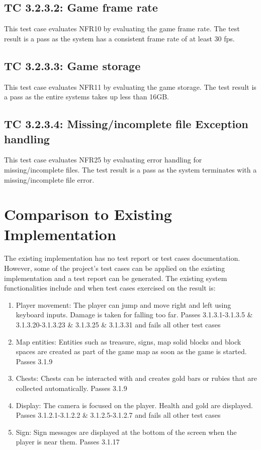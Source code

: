 \documentclass[12pt, titlepage]{article}
\begin{document}
\subsection*{TC 3.2.3.2: Game frame rate}
This test case evaluates NFR10 by evaluating the game frame rate. The test result is a pass as the system has a consistent frame rate of at least 30 fps.

\subsection*{TC 3.2.3.3: Game storage}
This test case evaluates NFR11 by evaluating the game storage. The test result is a pass as the entire systems takes up less than 16GB.

\subsection*{TC 3.2.3.4: Missing/incomplete file Exception handling}
This test case evaluates NFR25 by evaluating error handling for missing/incomplete files. The test result is a pass as the system terminates with a  missing/incomplete file error.

\section{Comparison to Existing Implementation}	

The existing implementation has no test report or test cases documentation. However, some of the project's test cases can be applied on the existing implementation and a test report can be generated. The existing system functionalities include and when test cases exercised on the result is:
\begin{enumerate}
\item{Player movement: The player can jump and move right and left using keyboard inputs. Damage is taken for falling too far. Passes 3.1.3.1-3.1.3.5 \& 3.1.3.20-3.1.3.23 \& 3.1.3.25 \& 3.1.3.31 and fails all other test cases}
\item{Map entities: Entities such as treasure, signs, map solid blocks and block spaces are created as part of the game map as soon as the game is started. Passes 3.1.9}
\item{Chests: Chests can be interacted with and creates gold bars or rubies that are collected automatically. Passes 3.1.9}
\item{Display: The camera is focused on the player. Health and gold are displayed. Passes 3.1.2.1-3.1.2.2 \& 3.1.2.5-3.1.2.7 and fails all other test cases}
\item{Sign: Sign messages are displayed at the bottom of the screen when the player is near them. Passes 3.1.17}
\end{enumerate}
\end{document}
